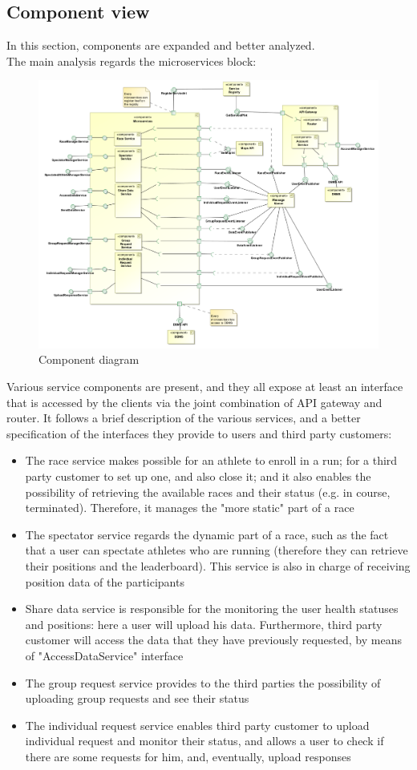 \subsection{Component view}
In this section, components are expanded and better analyzed. \\
The main analysis regards the microservices block: 
\begin{figure}[H]
\includegraphics[width=\linewidth]{Images/componentdiagram.pdf}
\caption{ Component diagram }
\label{fig:componentdiagram}
\end{figure}
Various service components are present, and they all expose at least an interface that is accessed by the
clients via the joint combination of API gateway and router.
It follows a brief description of the various services, and a better specification of the interfaces they provide to users and third party customers:
\begin{itemize}
\item The race service makes possible for an athlete to enroll in a run; for a third party customer to set
up one, and also close it; and it also enables the possibility of retrieving the available races and their
status (e.g. in course, terminated). Therefore, it manages the "more static" part
of a race
\item The spectator service regards the dynamic part of a race, such as the fact that a user can spectate
athletes who are running (therefore they can retrieve their positions and the leaderboard). This
service is also in charge of receiving position data of the participants
\item Share data service is responsible for the monitoring the user health statuses and positions: here a
user will upload his data. Furthermore, third party customer will access the data that they have
previously requested, by means of "AccessDataService" interface
\item The group request service provides to the third parties the possibility of uploading group requests and see their status 
\item The individual request service enables third party customer to upload individual request and monitor their status, and allows 
a user to check if there are some requests for him, and, eventually, upload responses 
\end{itemize}

